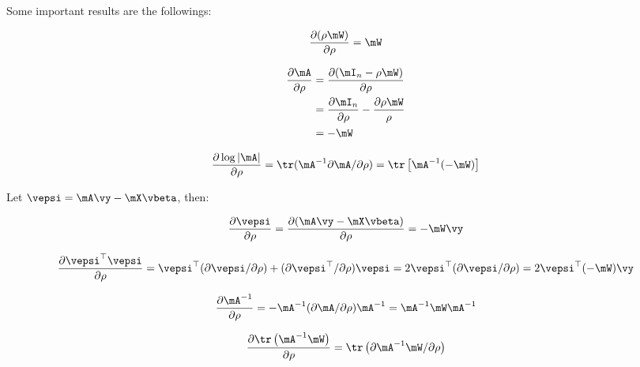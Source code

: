 \documentclass[english,12pt]{book}\usepackage[]{graphicx}\usepackage[]{xcolor}
\begin{document}
\begin{definition}\label{definition:matrix_cal_sar}
Some important results  are the followings:

\begin{equation}\label{eq:mc_1}
\frac{\partial (\rho \mW)}{\partial \rho} = \mW
\end{equation}

\begin{equation}\label{eq:mc_2}
  \begin{aligned}
\frac{\partial \mA}{\partial \rho} & = \frac{\partial (\mI_n - \rho\mW)}{\partial \rho} \\
                                   & = \frac{\partial \mI_n}{\partial \rho} - \frac{\partial \rho\mW}{\rho} \\
                                   & = -\mW
 \end{aligned}
\end{equation}

\begin{equation}\label{eq:mc_3}
\frac{\partial \log \left|\mA\right|}{\partial \rho}  = \tr(\mA^{-1}\partial \mA / \partial \rho) = \tr\left[\mA^{-1}(-\mW)\right]
\end{equation}

Let $\vepsi = \mA\vy - \mX\vbeta$, then:

\begin{equation}\label{eq:mc_4}
  \frac{\partial \vepsi}{\partial \rho} =  \frac{\partial (\mA\vy - \mX\vbeta)}{\partial \rho} = -\mW\vy 
\end{equation}

\begin{equation}\label{eq:mc_5}
  \frac{\partial \vepsi^\top \vepsi}{\partial \rho} = \vepsi^\top (\partial \vepsi / \partial \rho) + (\partial \vepsi ^\top / \partial \rho)\vepsi = 2\vepsi^\top (\partial \vepsi / \partial \rho) = 2\vepsi^\top(-\mW)\vy
\end{equation}

\begin{equation}\label{eq:mc_6}
  \frac{\partial \mA^{-1}}{\partial \rho} = -\mA^{-1}(\partial \mA / \partial \rho)\mA^{-1} = \mA^{-1} \mW \mA^{-1}
\end{equation}

\begin{equation}\label{eq:mc_7}
  \frac{\partial \tr\left(\mA^{-1} \mW\right)}{\partial \rho} = \tr\left(\partial \mA^{-1}\mW / \partial \rho\right) 
\end{equation}
\end{definition}
\end{document}
